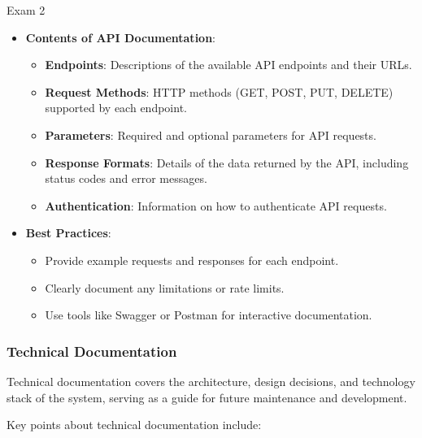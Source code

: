 \begin{examnotes}{Exam 2}
\begin{highlight}
        \begin{itemize}
            \item \textbf{Contents of API Documentation}:
                \begin{itemize}
                    \item \textbf{Endpoints}: Descriptions of the available API endpoints and their URLs.
                    \item \textbf{Request Methods}: HTTP methods (GET, POST, PUT, DELETE) supported by each endpoint.
                    \item \textbf{Parameters}: Required and optional parameters for API requests.
                    \item \textbf{Response Formats}: Details of the data returned by the API, including status codes and error messages.
                    \item \textbf{Authentication}: Information on how to authenticate API requests.
                \end{itemize}
            \item \textbf{Best Practices}:
                \begin{itemize}
                    \item Provide example requests and responses for each endpoint.
                    \item Clearly document any limitations or rate limits.
                    \item Use tools like Swagger or Postman for interactive documentation.
                \end{itemize}
        \end{itemize}
    \end{highlight}
    
    \subsubsection*{Technical Documentation}
    
    Technical documentation covers the architecture, design decisions, and technology stack of the system, serving as a guide for future maintenance and development.
    
    \begin{highlight}
        Key points about technical documentation include:
        

\end{highlight}
\end{examnotes}
